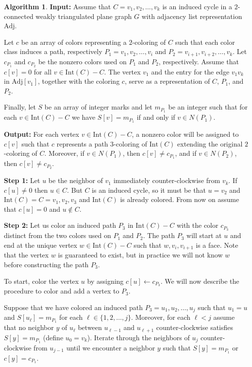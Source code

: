\documentclass[12pt,letterpaper]{article}
\theoremstyle{plain}
\theoremstyle{definition}
\theoremstyle{break}
\newtheorem{algorithm}[lemma]{Algorithm}     %
\begin{document}
\begin{algorithm}\label{A:poh_linear}
\textbf{Input:} Assume that $C=v_1,v_2,\ldots,v_k$ is an induced cycle in a
$2$-connected weakly triangulated plane
graph $G$ with adjacency list representation $\text{Adj}$.

Let $c$ be an array of colors
representing a $2$-coloring of $C$ such
that each color class induces a path, respectively $P_1=v_1,v_2,\ldots,v_i$ and
$P_2=v_{i+1},v_{i+2},\ldots,v_k$. Let $c_{P_1}$ and $c_{P_2}$ be the nonzero colors
used on $P_1$ and $P_2$, respectively. Assume that $c[v]=0$ for all
$v\in\text{Int}(C)-C$.
The vertex $v_1$ and the
entry for the edge $v_1v_k$ in $\text{Adj}[v_1]$, together with the
coloring $c$, serve as a representation of $C$, $P_1$, and $P_2$.

Finally, let $S$ be an array of integer marks and let $m_{P_1}$ be an integer
such that for each $v\in\text{Int}(C)-C$ we have $S[v]=m_{P_1}$ if and only if
$v\in N(P_1)$.

\textbf{Output:} For each vertex $v\in\text{Int}(C)-C$, a nonzero color will be
assigned to $c[v]$ such that $c$ represents a path $3$-coloring of
$\text{Int}(C)$ extending the original $2$-coloring of $C$. Moreover, if
$v\in N(P_1)$, then $c[v]\ne c_{P_1}$, and if $v\in N(P_2)$, then
$c[v]\ne c_{P_2}$.

\textbf{Step 1:} Let $u$ be the neighbor of $v_1$ immediately counter-clockwise from
$v_k$. If $c[u]\ne 0$ then $u\in C$. But $C$ is an induced cycle, so
it must be that $u=v_2$ and $\text{Int}(C)=C=v_1,v_2,v_3$ and
$\text{Int}(C)$ is already colored. From now on assume that $c[u]=0$ and
$u\not\in C$.

\textbf{Step 2:} Let us color an induced path $P_3$ in $\text{Int}(C)-C$ with the
color $c_{P_3}$ distinct
from the two colors used on
$P_1$ and $P_2$. The path $P_3$ will start at $u$ and end at the unique vertex
$w\in\text{Int}(C)-C$ such that $w,v_i,v_{i+1}$ is a face. Note that the vertex $w$ is
guaranteed to exist, but in practice we will not 
know $w$ before constructing the path $P_3$.

To start, color the vertex $u$ by assigning $c[u]\leftarrow c_{P_3}$. We will
now describe the procedure to color and add a vertex to $P_3$.

Suppose
that we have colored an induced path
$P_3=u_1,u_2,\ldots,u_j$ such that $u_1=u$ and $S[u_\ell]=m_{P_1}$ for each
$\ell\in\{1,2,\ldots,j\}$. Moreover, for each $\ell<j$ assume that no neighbor $y$ of $u_\ell$
between $u_{\ell-1}$ and $u_{\ell +1}$ counter-clockwise satisfies
$S[y]=m_{P_1}$ (define $u_0=v_k$). Iterate through the neighbors of $u_j$
counter-clockwise from $u_{j-1}$ until we
encounter a neighbor $y$ such that $S[y]=m_{P_1}$ or $c[y]=c_{P_1}$.


\end{algorithm}
\end{document}
